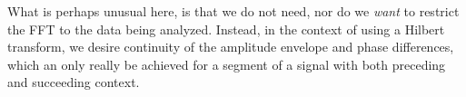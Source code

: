 \documentclass{article}
\begin{document}
What is perhaps unusual here, is that we do not need, nor do we {\em want}
to restrict the FFT to the data being analyzed.  Instead, in the context 
of using a Hilbert transform, we desire continuity of the amplitude envelope
and phase differences, which an only really be achieved for a segment of a 
signal with both preceding and succeeding context.


\section{}
\end{document}
